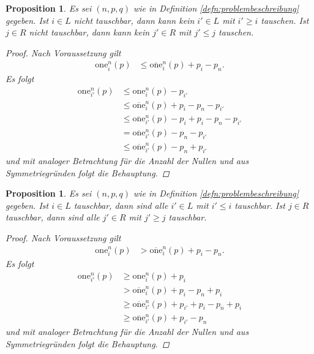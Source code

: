 \documentclass[12pt]{article}
\newtheorem{prop}[thm]{Proposition}
\begin{document}
\begin{prop}
Es sei $(n, p, q)$ wie in Definition \ref{defn:problembeschreibung} gegeben. Ist $i\in L$ nicht tauschbar, dann kann kein $i'\in L$ mit $i'\geq i$ tauschen. Ist $j\in R$ nicht tauschbar, dann kann kein $j'\in R$ mit $j'\leq j$ tauschen. 
\begin{proof}
Nach Voraussetzung gilt 
\begin{align*}
\mathrm{one}_i^{n}(p)
&\leq
\overline{\mathrm{one}}_i^{n}(p)
+
p_i-p_n.
\end{align*}
Es folgt
\begin{align*}
\mathrm{one}_{i'}^{n}(p)
&\leq
\mathrm{one}_{i}^{n}(p)
-
p_{i'}
\\
&\leq
\overline{\mathrm{one}}_i^{n}(p)
+
p_i-p_n
-
p_{i'}
\\
&\leq
\overline{\mathrm{one}}_{i'}^{n}(p)
-p_i
+
p_i-p_n
-
p_{i'}
\\
&=
\overline{\mathrm{one}}_{i'}^{n}(p)
-p_n
-
p_{i'}
\\
&\leq
\overline{\mathrm{one}}_{i'}^{n}(p)
-p_n
+
p_{i'}
\end{align*}
und mit analoger Betrachtung für die Anzahl der Nullen und aus Symmetriegründen 
folgt die Behauptung.
\end{proof}
\label{prop:i nicht tauschbar => i'>i nicht tauschbar}
\end{prop}

\begin{prop}
Es sei $(n, p, q)$ wie in Definition \ref{defn:problembeschreibung} gegeben. Ist $i\in L$ tauschbar, dann sind alle $i'\in L$ mit $i'\leq i$ tauschbar. Ist $j\in R$ tauschbar, dann sind alle $j'\in R$ mit $j'\geq j$ tauschbar. 
\begin{proof}
Nach Voraussetzung gilt 
\begin{align*}
\mathrm{one}_i^{n}(p)
&>
\overline{\mathrm{one}}_i^{n}(p)
+
p_i-p_n.
\end{align*}
Es folgt
\begin{align*}
\mathrm{one}_{i'}^{n}(p)
&\geq
\mathrm{one}_{i}^{n}(p)
+
p_{i}
\\
&>
\overline{\mathrm{one}}_i^{n}(p)
+
p_i-p_n
+
p_{i}
\\
&\geq
\overline{\mathrm{one}}_{i'}^{n}(p)
+ p_{i'}
+ p_i-p_n
+ p_{i}
\\
&\geq
\overline{\mathrm{one}}_{i'}^{n}(p)
+p_{i'}-p_n
\end{align*}
und mit analoger Betrachtung für die Anzahl der Nullen und aus Symmetriegründen 
folgt die Behauptung.
\end{proof}
\label{prop:i tauschbar => i'<i tauschbar}
\end{prop}
\end{document}
